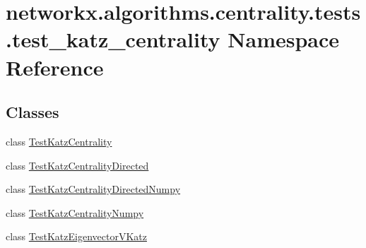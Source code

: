 \hypertarget{namespacenetworkx_1_1algorithms_1_1centrality_1_1tests_1_1test__katz__centrality}{}\section{networkx.\+algorithms.\+centrality.\+tests.\+test\+\_\+katz\+\_\+centrality Namespace Reference}
\label{namespacenetworkx_1_1algorithms_1_1centrality_1_1tests_1_1test__katz__centrality}
\subsection*{Classes}
\begin{DoxyCompactItemize}
\item 
class \hyperlink{classnetworkx_1_1algorithms_1_1centrality_1_1tests_1_1test__katz__centrality_1_1TestKatzCentrality}{Test\+Katz\+Centrality}
\item 
class \hyperlink{classnetworkx_1_1algorithms_1_1centrality_1_1tests_1_1test__katz__centrality_1_1TestKatzCentralityDirected}{Test\+Katz\+Centrality\+Directed}
\item 
class \hyperlink{classnetworkx_1_1algorithms_1_1centrality_1_1tests_1_1test__katz__centrality_1_1TestKatzCentralityDirectedNumpy}{Test\+Katz\+Centrality\+Directed\+Numpy}
\item 
class \hyperlink{classnetworkx_1_1algorithms_1_1centrality_1_1tests_1_1test__katz__centrality_1_1TestKatzCentralityNumpy}{Test\+Katz\+Centrality\+Numpy}
\item 
class \hyperlink{classnetworkx_1_1algorithms_1_1centrality_1_1tests_1_1test__katz__centrality_1_1TestKatzEigenvectorVKatz}{Test\+Katz\+Eigenvector\+V\+Katz}
\end{DoxyCompactItemize}

